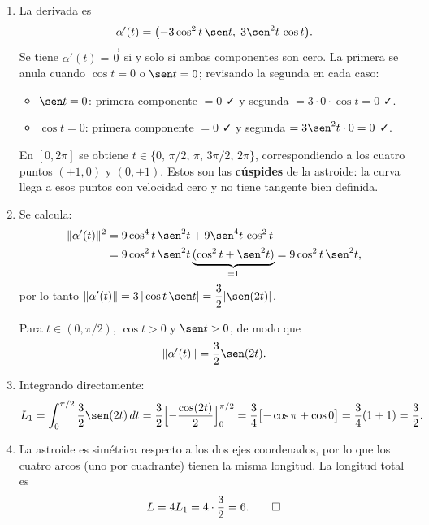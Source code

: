 \documentclass[11pt,respuestas,a4]{aleph-examen}
\begin{document}
\begin{preguntas}
\begin{respuesta}
\begin{enumerate}
    \item La derivada es
    \[
        \alpha'(t) = \bigl(-3\cos^2 t\,\sen t,\; 3\sen^2 t\,\cos t\bigr).
    \]
    Se tiene $\alpha'(t)=\vec{0}$ si y solo si ambas componentes son cero. La primera se anula cuando $\cos t=0$ o $\sen t=0$; revisando la segunda en cada caso:
    \begin{itemize}
        \item $\sen t=0$: primera componente $=0$ ✓ y segunda $= 3\cdot 0\cdot\cos t=0$ ✓.
        \item $\cos t=0$: primera componente $=0$ ✓ y segunda $= 3\sen^2 t\cdot 0=0$ ✓.
    \end{itemize}
    En $[0,2\pi]$ se obtiene $t\in\{0,\,\pi/2,\,\pi,\,3\pi/2,\,2\pi\}$, correspondiendo a los cuatro puntos $(\pm1,0)$ y $(0,\pm1)$. Estos son las \textbf{cúspides} de la astroide: la curva llega a esos puntos con velocidad cero y no tiene tangente bien definida.

    \item Se calcula:
    \begin{align*}
        \|\alpha'(t)\|^2 &= 9\cos^4 t\,\sen^2 t + 9\sen^4 t\,\cos^2 t \\
                         &= 9\cos^2 t\,\sen^2 t\underbrace{(\cos^2 t+\sen^2 t)}_{=1} = 9\cos^2 t\,\sen^2 t,
    \end{align*}
    por lo tanto $\|\alpha'(t)\| = 3\,|\cos t\,\sen t| = \dfrac{3}{2}|\sen(2t)|$.

    Para $t\in(0,\pi/2)$, $\cos t>0$ y $\sen t>0$, de modo que
    \[
        \|\alpha'(t)\| = \frac{3}{2}\sen(2t).
    \]

    \item Integrando directamente:
    \[
        L_1 = \int_0^{\pi/2}\frac{3}{2}\sen(2t)\,dt
            = \frac{3}{2}\Bigl[-\frac{\cos(2t)}{2}\Bigr]_0^{\pi/2}
            = \frac{3}{4}\bigl[-\cos\pi+\cos 0\bigr]
            = \frac{3}{4}(1+1) = \frac{3}{2}.
    \]

    \item La astroide es simétrica respecto a los dos ejes coordenados, por lo que los cuatro arcos (uno por cuadrante) tienen la misma longitud. La longitud total es
    \[
        L = 4L_1 = 4\cdot\frac{3}{2} = 6.\qedhere
    \]
\end{enumerate}
\end{respuesta}


\end{preguntas}
\end{document}
